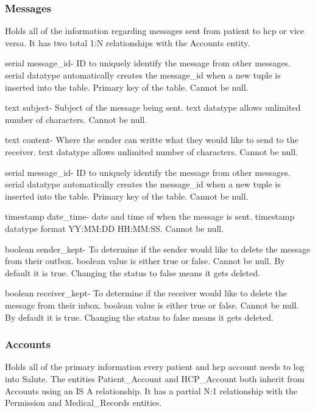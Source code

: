 \documentclass[12pt]{report}
\begin{document}
\subsubsection{Messages}
Holds all of the information regarding messages sent from patient to hcp or vice versa. It has two total 1:N relationships with the Accounts entity.

\begin{description}
\item serial message\_id- ID to uniquely identify the message from other messages. serial datatype automatically creates the message\_id when a new tuple is inserted into the table.  Primary key of the table.  Cannot be null.
\item text subject- Subject of the message being sent. text datatype allows unlimited number of characters.  Cannot be null.
\item text content- Where the sender can writte what they would like to send to the receiver.  text datatype allows unlimited number of characters.  Cannot be null.
\item serial message\_id- ID to uniquely identify the message from other messages. serial datatype automatically creates the message\_id when a new tuple is inserted into the table.  Primary key of the table.  Cannot be null.
\item timestamp date\_time- date and time of when the message is sent.  timestamp datatype format YY:MM:DD HH:MM:SS.  Cannot be null.
\item boolean sender\_kept- To determine if the sender would like to delete the message from their outbox.  boolean value is either true or false.  Cannot be null.  By default it is true.  Changing the status to false means it gets deleted.
\item boolean receiver\_kept- To determine if the receiver would like to delete the message from their inbox.  boolean value is either true or false.  Cannot be null.  By default it is true.  Changing the status to false means it gets deleted.
\end{description}

\subsubsection{Accounts}
Holds all of the primary information every patient and hcp account needs to log into Salute.  The entities Patient\_Account and HCP\_Account both inherit from Accounts using an IS A relationship.  It has a partial N:1 relationship with the Permission and Medical\_Records entities.
\end{document}
